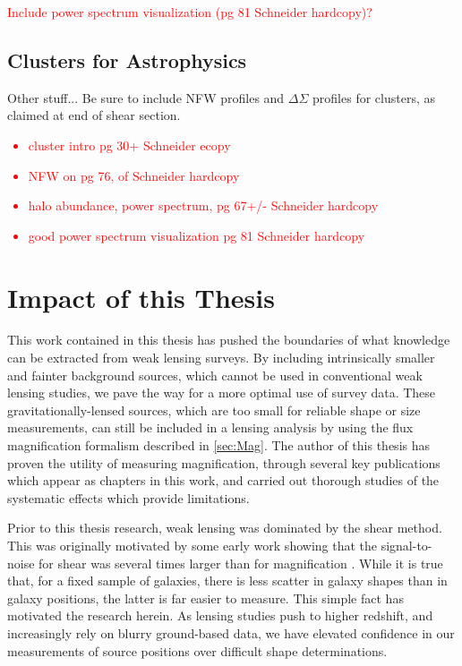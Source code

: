 \textcolor{red}{Include power spectrum visualization (pg 81 Schneider hardcopy)?}

\subsection{Clusters for Astrophysics}
\label{sec:ClusterAstro}

Other stuff... \citep{Voit05} Be sure to include NFW profiles and $\Delta\Sigma$ profiles for clusters, as claimed at end of shear section.

\textcolor{red}{\begin{itemize}\item cluster intro pg 30+ Schneider ecopy \item NFW on pg 76, of Schneider hardcopy \item halo abundance, power spectrum, pg 67+/- Schneider hardcopy \item good power spectrum visualization pg 81 Schneider hardcopy \end{itemize}}


\section{Impact of this Thesis}
\label{sec:Impact}

This work contained in this thesis has pushed the boundaries of what knowledge can be extracted from weak lensing surveys. By including intrinsically smaller and fainter background sources, which cannot be used in conventional weak lensing studies, we pave the way for a more optimal use of survey data. These gravitationally-lensed sources, which are too small for reliable shape or size measurements, can still be included in a lensing analysis by using the flux magnification formalism described in \autoref{sec:Mag}. The author of this thesis has proven the utility of measuring magnification, through several key publications which appear as chapters in this work, and carried out thorough studies of the systematic effects which provide limitations. 

Prior to this thesis research, weak lensing was dominated by the shear method. This was originally motivated by some early work showing that the signal-to-noise for shear was several times larger than for magnification \citep{Schneider00}. While it is true that, for a fixed sample of galaxies, there is less scatter in galaxy shapes than in galaxy positions, the latter is far easier to measure. This simple fact has motivated the research herein. As lensing studies push to higher redshift, and increasingly rely on blurry ground-based data, we have elevated confidence in our measurements of source positions over difficult shape determinations. 

